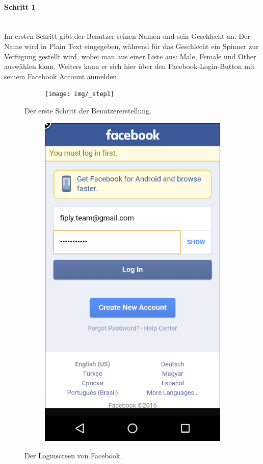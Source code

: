 \documentclass[FIPLY_base.tex]{subfiles}
\begin{document}
\paragraph{Schritt 1}\ \\
Im ersten Schritt gibt der Benutzer seinen Namen und sein Geschlecht an.
Der Name wird in Plain Text eingegeben, während für das Geschlecht ein Spinner zur Verfügung gestellt wird, wobei man aus einer Liste aus: Male, Female und Other auswählen kann.
Weiters kann er sich hier über den Facebook-Login-Button mit seinem Facebook Account anmelden.
\begin{figure}[H]
	\begin{subfigure}[b]{0.3\textwidth}
	\texttt{[image: img/\_step1]}
	\end{subfigure}
	\hfil
	\caption{Der erste Schritt der Benutzererstellung.}
	\begin{subfigure}[b]{0.3\textwidth}
	\includegraphics[scale=0.55]{img/User_facebooklogin}
	\end{subfigure}
	\hfil
	\caption{Der Loginscreen von Facebook.}
	
\end{figure}
\newpage
\end{document}

